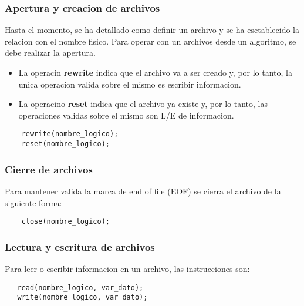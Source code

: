 \subsubsection{Apertura y creacion de archivos}
Hasta el momento, se ha detallado como definir un archivo y se ha esctablecido la relacion con el nombre fisico. Para operar con un archivos desde un algoritmo, se debe realizar la apertura.
\begin{itemize}
    \item La operacin \textbf{rewrite} indica que el archivo va a ser creado y, por lo tanto, la unica operacion valida sobre el mismo es escribir informacion.
    \item La operacino \textbf{reset} indica que el archivo ya existe y, por lo tanto, las operaciones validas sobre el mismo son L/E de informacion.
\end{itemize}
\begin{lstlisting}
    rewrite(nombre_logico);
    reset(nombre_logico);
\end{lstlisting}

\subsubsection{Cierre de archivos}
Para mantener valida la marca de end of file (EOF) se cierra el archivo de la siguiente forma:
\begin{lstlisting}
    close(nombre_logico);
\end{lstlisting}

\subsubsection{Lectura y escritura de archivos}
Para leer o escribir informacion en un archivo, las instrucciones son:
\begin{lstlisting}
   read(nombre_logico, var_dato);
   write(nombre_logico, var_dato);
\end{lstlisting}

